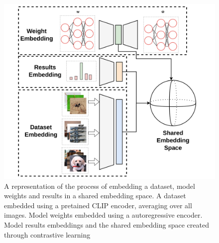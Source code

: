 \begin{figure}[!t]
    \centering
    \includegraphics[width=0.75\linewidth]{pipeline.png}
    \caption[A figure illustrating the process of embedding a dataset,model weigths and results into a shared embedding space ]{A representation of the process of embedding a dataset, model weights and results in a shared embedding space. A dataset embedded using a pretained CLIP encoder, averaging over all images. Model weights embedded using a autoregressive encoder. Model results embeddings and the shared embedding space created through contrastive learning \cite{dahl+etal_taslp12}  }
    \label{fig:pipeline}
\end{figure}









